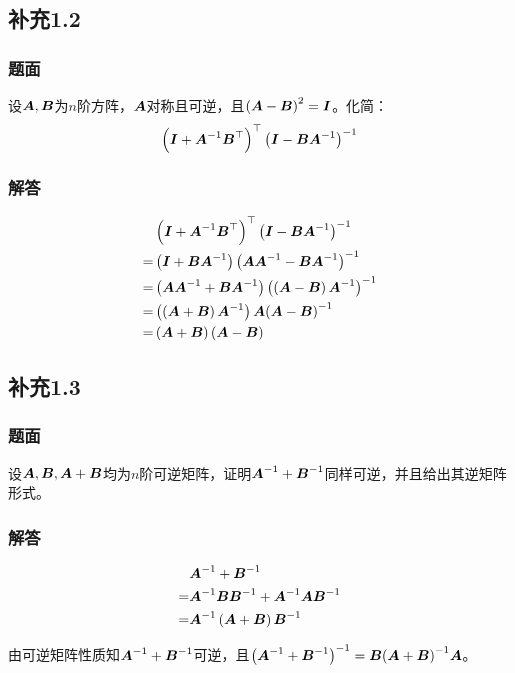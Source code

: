 \documentclass{beamer}
\begin{document}
\subsection*{补充1.2}

\begin{frame}
\frametitle{题面}

    设\(\mata,\matb\)为\(n\)阶方阵，\(\mata\)对称且可逆，且\(\mypar{\mata-\matb}^2=\mati\)。化简：
    \begin{equation*}
        \mypar{\mati+\inv{\mata}\matb^\top}^\top\inv{\mypar{\mati-\matb\inv{\mata}}}
    \end{equation*}

\end{frame}

\begin{frame}
\frametitle{解答}

    \begin{align*}
          & \mypar{\mati+\inv{\mata}\matb^\top}^\top\inv{\mypar{\mati-\matb\inv{\mata}}}          \\
        = & \mypar{\mati+\matb\inv{\mata}}\inv{\mypar{\mata\inv{\mata}-\matb\inv{\mata}}}         \\
        = & \mypar{\mata\inv{\mata}+\matb\inv{\mata}}\inv{\mypar{\mypar{\mata-\matb}\inv{\mata}}} \\
        = & \mypar{\mypar{\mata+\matb}\inv{\mata}}\mata\inv{\mypar{\mata-\matb}}                  \\
        = & \mypar{\mata+\matb}\mypar{\mata-\matb}
    \end{align*}

\end{frame}

\subsection*{补充1.3}

\begin{frame}
\frametitle{题面}

    设\(\mata,\matb,\mata+\matb\)均为\(n\)阶可逆矩阵，证明\(\inv{\mata}+\inv{\matb}\)同样可逆，并且给出其逆矩阵形式。

\end{frame}

\begin{frame}
\frametitle{解答}

    \begin{align*}
          & \inv{\mata}+\inv{\matb}                                 \\
        = & \inv{\mata}\matb\inv{\matb}+\inv{\mata}\mata\inv{\matb} \\
        = & \inv{\mata}\mypar{\mata+\matb}\inv{\matb}               \\
    \end{align*}

    由可逆矩阵性质知\(\inv{\mata}+\inv{\matb}\)可逆，且\(\inv{\mypar{\inv{\mata}+\inv{\matb}}}=\matb\inv{\mypar{\mata+\matb}}\mata\)。

\end{frame}
\end{document}
